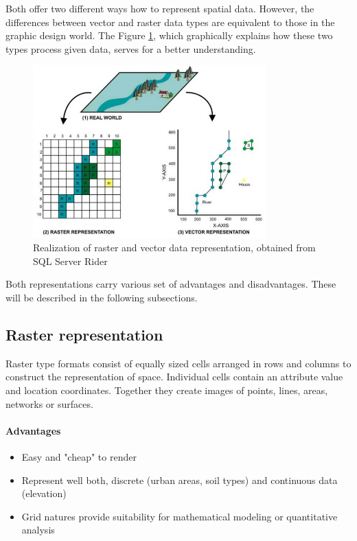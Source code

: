\documentclass[thesis=M,english]{FITthesis}[2012/10/20]
\begin{document}
Both offer two different ways how to represent spatial data. However, the differences between vector and raster data types are equivalent to those in the graphic design world. The Figure \ref{pic:RasterVector}, which graphically explains how these two types process given data, serves for a better understanding.

\begin{figure}[h]
\centering
\includegraphics[width=0.8\textwidth]{pics/RasterVectorPreview}
\caption{Realization of raster and vector data representation, obtained from SQL Server Rider \cite{SQL13}}
\label{pic:RasterVector}
\end{figure}

Both representations carry various set of advantages and disadvantages. These will be described in the following subsections.

\subsection{Raster representation}
Raster type formats consist of equally sized cells arranged in rows and columns to construct the representation of space. Individual cells contain an attribute value and location coordinates. Together they create images of points, lines, areas, networks or surfaces.

\paragraph*{Advantages}
\begin{itemize}[noitemsep]
\item Easy and "cheap" to render
\item Represent well both, discrete (urban areas, soil types) and continuous data (elevation)
\item Grid natures provide suitability for mathematical modeling or quantitative analysis
\end{itemize}
\end{document}
